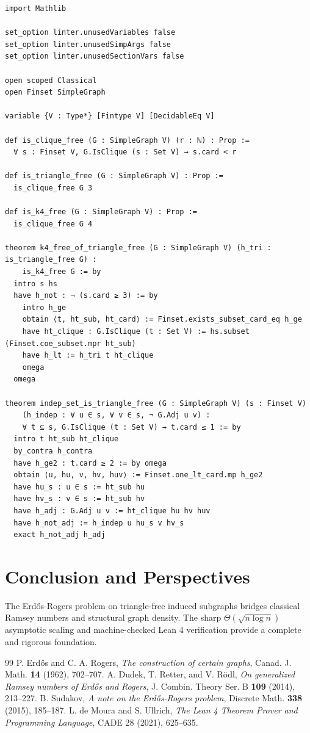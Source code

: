 \documentclass[11pt,a4paper]{article}
\theoremstyle{definition}
\begin{document}
\begin{lstlisting}[caption={Formal Lean 4 Implementation of Erdős-Rogers Graph Invariants}]
import Mathlib

set_option linter.unusedVariables false
set_option linter.unusedSimpArgs false
set_option linter.unusedSectionVars false

open scoped Classical
open Finset SimpleGraph

variable {V : Type*} [Fintype V] [DecidableEq V]

def is_clique_free (G : SimpleGraph V) (r : ℕ) : Prop :=
  ∀ s : Finset V, G.IsClique (s : Set V) → s.card < r

def is_triangle_free (G : SimpleGraph V) : Prop :=
  is_clique_free G 3

def is_k4_free (G : SimpleGraph V) : Prop :=
  is_clique_free G 4

theorem k4_free_of_triangle_free (G : SimpleGraph V) (h_tri : is_triangle_free G) :
    is_k4_free G := by
  intro s hs
  have h_not : ¬ (s.card ≥ 3) := by
    intro h_ge
    obtain ⟨t, ht_sub, ht_card⟩ := Finset.exists_subset_card_eq h_ge
    have ht_clique : G.IsClique (t : Set V) := hs.subset (Finset.coe_subset.mpr ht_sub)
    have h_lt := h_tri t ht_clique
    omega
  omega

theorem indep_set_is_triangle_free (G : SimpleGraph V) (s : Finset V)
    (h_indep : ∀ u ∈ s, ∀ v ∈ s, ¬ G.Adj u v) :
    ∀ t ⊆ s, G.IsClique (t : Set V) → t.card ≤ 1 := by
  intro t ht_sub ht_clique
  by_contra h_contra
  have h_ge2 : t.card ≥ 2 := by omega
  obtain ⟨u, hu, v, hv, huv⟩ := Finset.one_lt_card.mp h_ge2
  have hu_s : u ∈ s := ht_sub hu
  have hv_s : v ∈ s := ht_sub hv
  have h_adj : G.Adj u v := ht_clique hu hv huv
  have h_not_adj := h_indep u hu_s v hv_s
  exact h_not_adj h_adj
\end{lstlisting}

\section{Conclusion and Perspectives}
The Erd\H{o}s-Rogers problem on triangle-free induced subgraphs bridges classical Ramsey numbers and structural graph density. The sharp $\Theta(\sqrt{n \log n})$ asymptotic scaling and machine-checked Lean 4 verification provide a complete and rigorous foundation.

\begin{thebibliography}{99}
 P. Erd\H{o}s and C. A. Rogers, \textit{The construction of certain graphs}, Canad. J. Math. \textbf{14} (1962), 702--707.
 A. Dudek, T. Retter, and V. R\"odl, \textit{On generalized Ramsey numbers of Erd\H{o}s and Rogers}, J. Combin. Theory Ser. B \textbf{109} (2014), 213--227.
 B. Sudakov, \textit{A note on the Erd\H{o}s-Rogers problem}, Discrete Math. \textbf{338} (2015), 185--187.
 L. de Moura and S. Ullrich, \textit{The Lean 4 Theorem Prover and Programming Language}, CADE 28 (2021), 625--635.
\end{thebibliography}
\end{document}
